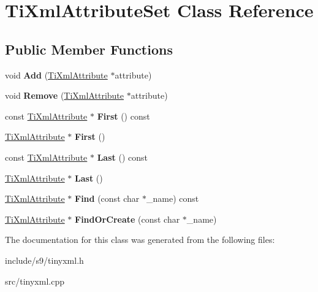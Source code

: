 \hypertarget{classTiXmlAttributeSet}{\section{Ti\-Xml\-Attribute\-Set Class Reference}
\label{classTiXmlAttributeSet}
}
\subsection*{Public Member Functions}
\begin{DoxyCompactItemize}
\item 
\hypertarget{classTiXmlAttributeSet_a745e50ddaae3bee93e4589321e0b9c1a}{void {\bfseries Add} (\hyperlink{classTiXmlAttribute}{Ti\-Xml\-Attribute} $\ast$attribute)}\label{classTiXmlAttributeSet_a745e50ddaae3bee93e4589321e0b9c1a}

\item 
\hypertarget{classTiXmlAttributeSet_a924a73d071f2573f9060f0be57879c57}{void {\bfseries Remove} (\hyperlink{classTiXmlAttribute}{Ti\-Xml\-Attribute} $\ast$attribute)}\label{classTiXmlAttributeSet_a924a73d071f2573f9060f0be57879c57}

\item 
\hypertarget{classTiXmlAttributeSet_ae0636e88cedd4b09d61c451860f68598}{const \hyperlink{classTiXmlAttribute}{Ti\-Xml\-Attribute} $\ast$ {\bfseries First} () const }\label{classTiXmlAttributeSet_ae0636e88cedd4b09d61c451860f68598}

\item 
\hypertarget{classTiXmlAttributeSet_a99703bb08ca2aece2d7ef835de339ba0}{\hyperlink{classTiXmlAttribute}{Ti\-Xml\-Attribute} $\ast$ {\bfseries First} ()}\label{classTiXmlAttributeSet_a99703bb08ca2aece2d7ef835de339ba0}

\item 
\hypertarget{classTiXmlAttributeSet_a7b3f3ccf39a97bc25539d3fcc540296a}{const \hyperlink{classTiXmlAttribute}{Ti\-Xml\-Attribute} $\ast$ {\bfseries Last} () const }\label{classTiXmlAttributeSet_a7b3f3ccf39a97bc25539d3fcc540296a}

\item 
\hypertarget{classTiXmlAttributeSet_ab4c4edfb2d74f6ea31aae096743bd6e0}{\hyperlink{classTiXmlAttribute}{Ti\-Xml\-Attribute} $\ast$ {\bfseries Last} ()}\label{classTiXmlAttributeSet_ab4c4edfb2d74f6ea31aae096743bd6e0}

\item 
\hypertarget{classTiXmlAttributeSet_af3675cc2bfd0aea153cda1cfcdd1f77e}{\hyperlink{classTiXmlAttribute}{Ti\-Xml\-Attribute} $\ast$ {\bfseries Find} (const char $\ast$\-\_\-name) const }\label{classTiXmlAttributeSet_af3675cc2bfd0aea153cda1cfcdd1f77e}

\item 
\hypertarget{classTiXmlAttributeSet_a5e28f5d32f048fba85d04dc317495bdc}{\hyperlink{classTiXmlAttribute}{Ti\-Xml\-Attribute} $\ast$ {\bfseries Find\-Or\-Create} (const char $\ast$\-\_\-name)}\label{classTiXmlAttributeSet_a5e28f5d32f048fba85d04dc317495bdc}

\end{DoxyCompactItemize}


The documentation for this class was generated from the following files\-:\begin{DoxyCompactItemize}
\item 
include/s9/tinyxml.\-h\item 
src/tinyxml.\-cpp\end{DoxyCompactItemize}
